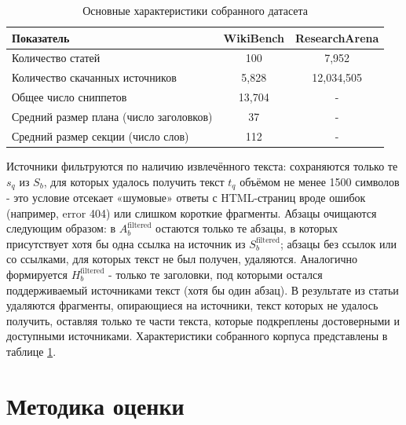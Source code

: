\documentclass{article}
\theoremstyle{definition}
\theoremstyle{plain}
\begin{document}
\begin{table}[ht!]
  \centering
  \caption{Основные характеристики собранного датасета}
  \label{tab:dataset}
  \begin{tabular}{lcc}
    \hline
    \textbf{Показатель} & \textbf{WikiBench} & \textbf{ResearchArena} \\
    \hline
    Количество статей                             & 100 & 7,952\\
    \hline
    Количество скачанных источников               & 5,828 & 12,034,505\\
    \hline
    Общее число сниппетов                         & 13,704 & -\\
    \hline
    Средний размер плана (число заголовков)       & 37 & -\\
    \hline
    Средний размер секции (число слов)            & 112 & -\\
    \hline
  \end{tabular}
\end{table}

Источники фильтруются по наличию извлечённого текста: сохраняются только те \(s_q\) из \(S_b\), для которых удалось получить текст \(t_q\) объёмом не менее 1500 символов - 
это условие отсекает «шумовые» ответы с HTML-страниц вроде ошибок (например, error 404) или слишком короткие фрагменты. 
Абзацы очищаются следующим образом: в \(A_b^{\mathrm{filtered}}\) остаются только те абзацы, в которых присутствует хотя бы одна ссылка на источник из \(S_b^{\mathrm{filtered}}\); 
абзацы без ссылок или со ссылками, для которых текст не был получен, удаляются. 
Аналогично формируется \(H_b^{\mathrm{filtered}}\) - только те заголовки, под которыми остался поддерживаемый источниками текст (хотя бы один абзац).
В результате из статьи удаляются фрагменты, опирающиеся на источники, текст которых не удалось получить, оставляя только те части текста,
которые подкреплены достоверными и доступными источниками. Характеристики собранного корпуса представлены в таблице \ref{tab:dataset}.

\section*{Методика оценки}
\end{document}
